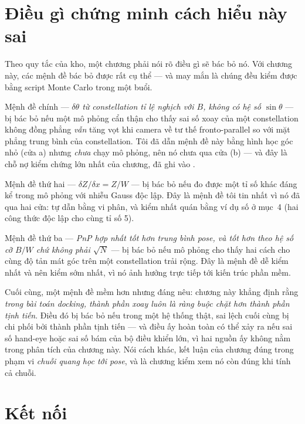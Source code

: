 \documentclass[../../marker.tex]{subfiles}
\begin{document}
\section{Điều gì chứng minh cách hiểu này sai}

Theo quy tắc của kho, một chương phải nói rõ điều gì sẽ bác bỏ nó. Với chương này, các mệnh đề bác bỏ được rất cụ thể --- và may mắn là chúng đều kiểm được bằng script Monte Carlo trong một buổi.

Mệnh đề chính --- \emph{\(\delta\theta\) từ constellation tỉ lệ nghịch với \(B\), không có hệ số \(\sin\theta\)} --- bị bác bỏ nếu một mô phỏng cẩn thận cho thấy sai số xoay của một constellation không đồng phẳng \emph{vẫn} tăng vọt khi camera về tư thế fronto-parallel so với mặt phẳng trung bình của constellation. Tôi đã dẫn mệnh đề này bằng hình học góc nhỏ (cửa a) nhưng \emph{chưa} chạy mô phỏng, nên nó chưa qua cửa (b) --- và đây là chỗ nợ kiểm chứng lớn nhất của chương, đã ghi vào .

Mệnh đề thứ hai --- \emph{\(\delta Z/\delta x = Z/W\)} --- bị bác bỏ nếu đo được một tỉ số khác đáng kể trong mô phỏng với nhiễu Gauss độc lập. Đây là mệnh đề tôi tin nhất vì nó đã qua hai cửa: tự dẫn bằng vi phân, và kiểm nhất quán bằng ví dụ số ở mục~4 (hai công thức độc lập cho cùng tỉ số 5).

Mệnh đề thứ ba --- \emph{PnP hợp nhất tốt hơn trung bình pose, và tốt hơn theo hệ số cỡ \(B/W\) chứ không phải \(\sqrt{N}\)} --- bị bác bỏ nếu mô phỏng cho thấy hai cách cho cùng độ tản mát góc trên một constellation trải rộng. Đây là mệnh đề dễ kiểm nhất và nên kiểm sớm nhất, vì nó ảnh hưởng trực tiếp tới kiến trúc phần mềm.

Cuối cùng, một mệnh đề mềm hơn nhưng đáng nêu: chương này khẳng định rằng \emph{trong bài toán docking, thành phần xoay luôn là ràng buộc chặt hơn thành phần tịnh tiến}. Điều đó bị bác bỏ nếu trong một hệ thống thật, sai lệch cuối cùng bị chi phối bởi thành phần tịnh tiến --- và điều ấy hoàn toàn có thể xảy ra nếu sai số hand-eye hoặc sai số bám của bộ điều khiển lớn, vì hai nguồn ấy không nằm trong phân tích của chương này. Nói cách khác, kết luận của chương đúng trong phạm vi \emph{chuỗi quang học tới pose}, và  là chương kiểm xem nó còn đúng khi tính cả chuỗi.

\section{Kết nối}
\end{document}
